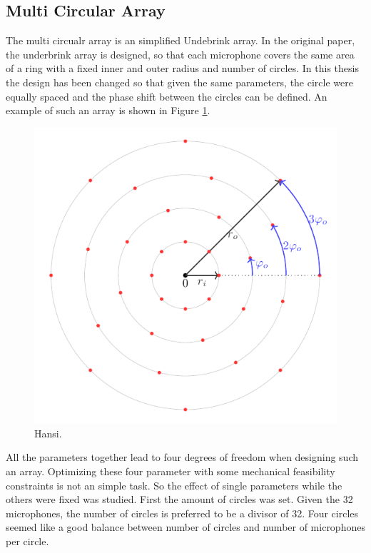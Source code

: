 \subsection{Multi Circular Array}
The multi circualr array is an simplified Undebrink array.
In the original paper, the underbrink array is designed, so that each
microphone covers the same area of a ring with a fixed inner and outer radius and number of circles.
In this thesis the design has been changed so that given the same parameters,
the circle were equally spaced and the phase shift between the circles can be defined.
An example of such an array is shown in Figure \ref*{aev:fig:FancyArr}.
\begin{figure}[h]
	\centering
	\includegraphics[]{images/5_array_evaluation/fancy_arr.pdf}
	\caption{Hansi.}
	\label{aev:fig:FancyArr}
\end{figure}

All the parameters together lead to four degrees of freedom when designing such an array.
Optimizing these four parameter with some mechanical feasibility constraints is not an simple task.
So the effect of single parameters while the others were fixed was studied.
First the amount of circles was set.
Given the 32 microphones, the number of circles is preferred to be a divisor 
of 32.
Four circles seemed like a good balance between number of circles and number of microphones
per circle.

